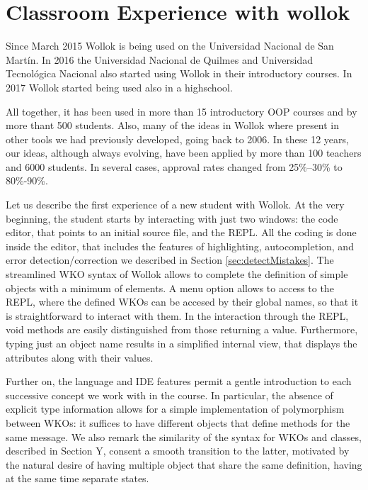 \section{Classroom Experience with wollok}
\label{experience}

Since March 2015 Wollok is being used on the Universidad Nacional de San Martín. 
In 2016 the Universidad Nacional de Quilmes and Universidad Tecnológica Nacional also started using Wollok in their introductory courses.
In 2017 Wollok started being used also in a highschool. 

All together, it has been used in more than 15 introductory OOP courses and by more thant 500 students.
Also, many of the ideas in Wollok where present in other tools we had previously developed, going back to 2006. In these 12 years, our ideas, although always evolving, have been applied by more than 100 teachers and 6000 students. 
In several cases, approval rates changed from 25\%--30\% to 80\%-90\%.

Let us describe the first experience of a new student with Wollok.
At the very beginning, the student starts by interacting with just two windows: the code editor, that points to an initial source file, and the REPL.
All the coding is done inside the editor, that includes the features of highlighting, autocompletion, and error detection/correction we described in Section \ref{sec:detectMistakes}. The streamlined WKO syntax of Wollok allows to complete the definition of simple objects with a minimum of elements. A menu option allows to access to the REPL, where the defined WKOs can be accesed by their global names, so that it is straightforward to interact with them. In the interaction through the REPL, void methods are easily distinguished from those returning a value. Furthermore, typing just an object name results in a simplified internal view, that displays the attributes along with their values.

Further on, the language and IDE features permit a gentle introduction to each successive concept we work with in the course. 
In particular, the absence of explicit type information allows for a simple implementation of polymorphism between WKOs: it suffices to have different objects that define methods for the same message.
We also remark the similarity of the syntax for WKOs and classes, described in Section Y, consent a smooth transition to the latter, motivated by the natural desire of having multiple object that share the same definition, having at the same time separate states.

